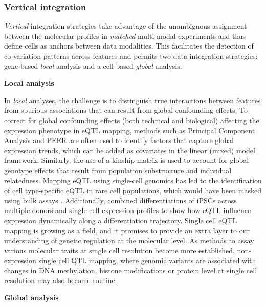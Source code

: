 \subsubsection{Vertical integration}
\textit{Vertical} integration strategies take advantage of the unambiguous assignment between the molecular profiles in \textit{matched} multi-modal experiments and thus define cells as anchors between data modalities. This facilitates the detection of co-variation patterns across features and permits two data integration strategies: gene-based \textit{local} analysis and a cell-based \textit{global} analysis.

\textbf{Local analysis}

In \textit{local} analyses, the challenge is to distinguish true interactions between features from spurious associations that can result from global confounding effects. To correct for global confounding effects (both technical and biological) affecting the expression phenotype in eQTL mapping, methods such as Principal Component Analysis and PEER \cite{Stegle2010} are often used to identify factors that capture global expression trends, which can be added as covariates in the linear (mixed) model framework. Similarly, the use of a kinship matrix is used to account for global genotype effects that result from population substructure and individual relatedness. Mapping eQTL using single-cell genomics has led to the identification of cell type-specific eQTL in rare cell populations, which would have been masked using bulk assays \cite{VanDerWijst2018}. Additionally, \cite{Cuomo2020} combined differentiations of iPSCs across multiple donors and single cell expression profiles to show how eQTL influence expression dynamically along a differentiation trajectory. Single cell eQTL mapping is growing as a field, and it promises to provide an extra layer to our understanding of genetic regulation at the molecular level. As methods to assay various molecular traits at single cell resolution become more established, non-expression single cell QTL mapping, where genomic variants are associated with changes in DNA methylation, histone modifications or protein level at single cell resolution may also become routine.

\textbf{Global analysis}


